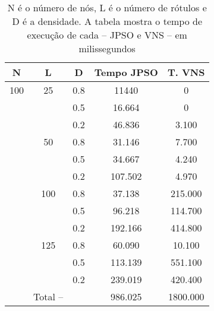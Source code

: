 \documentclass{sig-alternate-05-2015}
\begin{document}
\begin{table}
	
	\begin{tabular}{ccccc}
		\hline \rule[-2ex]{0pt}{5.5ex} N & L & D & Tempo JPSO& T. VNS   \\
		\hline\rule[-2ex]{0pt}{5.5ex} 100 & 25 & 0.8 &11440 & 0\\
		\rule[-2ex]{0pt}{5.5ex}  &  & 0.5 & 16.664 & 0\\
		\rule[-2ex]{0pt}{5.5ex}  &  & 0.2 & 46.836 & 3.100\\
		\rule[-2ex]{0pt}{5.5ex}  & 50 & 0.8 & 31.146 & 7.700\\
		\rule[-2ex]{0pt}{5.5ex}  &  & 0.5 & 34.667 & 4.240\\
		\rule[-2ex]{0pt}{5.5ex}  &  & 0.2 & 107.502 & 4.970\\
		\rule[-2ex]{0pt}{5.5ex}  & 100 & 0.8 & 37.138 & 215.000\\
		\rule[-2ex]{0pt}{5.5ex}  &  & 0.5 & 96.218 & 114.700\\
		\rule[-2ex]{0pt}{5.5ex}  &  & 0.2 & 192.166 & 414.800\\ 
		\rule[-2ex]{0pt}{5.5ex}  & 125 & 0.8 & 60.090 & 10.100\\ 
		\rule[-2ex]{0pt}{5.5ex}  &  & 0.5 & 113.139 & 551.100\\ 
		\rule[-2ex]{0pt}{5.5ex}  &  & 0.2 & 239.019 & 420.400\\ 
		\hline\rule[-2ex]{0pt}{5.5ex}  & Total -- &  & 986.025 & 1800.000\\ 
		\hline 
	\end{tabular} 
	\caption{N é o número de nós, L é o número de rótulos e D é a densidade.  A tabela mostra o tempo de execução de cada -- JPSO e VNS -- em milissegundos}
	\label{tab4}
\end{table}
\end{document}
